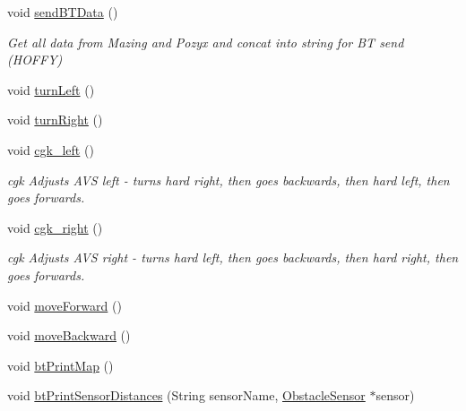\begin{DoxyCompactItemize}
void \mbox{\hyperlink{bot_main_8ino_a9c7adb3a38b0de84b613e166666630d6}{send\+B\+T\+Data}} ()
\begin{DoxyCompactList}\small\item\em Get all data from Mazing and Pozyx and concat into string for BT send (H\+O\+F\+FY) \end{DoxyCompactList}\item 
void \mbox{\hyperlink{bot_main_8ino_adaf487f84c38e060c84f3cb829e70f2b}{turn\+Left}} ()
\item 
void \mbox{\hyperlink{bot_main_8ino_acf4fa5da14085c3a9a170f9de29d2755}{turn\+Right}} ()
\item 
void \mbox{\hyperlink{bot_main_8ino_aa715717e784a7e14ea274f10f05717c0}{cgk\+\_\+left}} ()
\begin{DoxyCompactList}\small\item\em cgk Adjusts A\+VS left -\/ turns hard right, then goes backwards, then hard left, then goes forwards. \end{DoxyCompactList}\item 
void \mbox{\hyperlink{bot_main_8ino_ad995d8479412ad51f45bebe8e1c8c96e}{cgk\+\_\+right}} ()
\begin{DoxyCompactList}\small\item\em cgk Adjusts A\+VS right -\/ turns hard left, then goes backwards, then hard right, then goes forwards. \end{DoxyCompactList}\item 
void \mbox{\hyperlink{bot_main_8ino_a618d986e214be5b102686274ac420be0}{move\+Forward}} ()
\item 
void \mbox{\hyperlink{bot_main_8ino_a39321c04c34c4c2e46ed14803bdddd39}{move\+Backward}} ()
\item 
void \mbox{\hyperlink{bot_main_8ino_afe9e137a49398f1d502cfbeaa4f25f45}{bt\+Print\+Map}} ()
\item 
void \mbox{\hyperlink{bot_main_8ino_aa06c138d870f51c3482c99ed475f9d58}{bt\+Print\+Sensor\+Distances}} (String sensor\+Name, \mbox{\hyperlink{class_obstacle_sensor}{Obstacle\+Sensor}} $\ast$sensor)
\end{DoxyCompactItemize}
